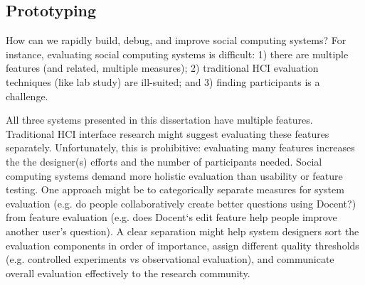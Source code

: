 
\subsection{Prototyping}
How can we rapidly build, debug, and improve social computing systems? For instance, evaluating social computing systems is difficult: 1) there are multiple features (and related, multiple measures); 2) traditional HCI evaluation techniques (like lab study) are ill-suited; and 3) finding participants is a challenge.

All three systems presented in this dissertation have multiple features. Traditional HCI interface research might suggest evaluating these features separately. Unfortunately, this is prohibitive: evaluating many features increases the  the designer(s) efforts and the number of participants needed. Social computing systems demand more holistic evaluation than usability or feature testing. One approach might be to categorically separate measures for system evaluation (e.g. do people collaboratively create better questions using Docent?) from feature evaluation (e.g. does Docent‘s edit feature help people improve another user’s question). A clear separation might help system designers sort the evaluation components in order of importance, assign different quality thresholds (e.g. controlled experiments vs observational evaluation), and communicate overall evaluation effectively to the research community.



